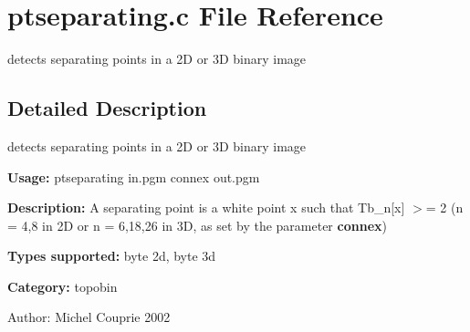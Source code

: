 \section{ptseparating.c File Reference}
\label{ptseparating_8c}
detects separating points in a 2D or 3D binary image 



\subsection{Detailed Description}
detects separating points in a 2D or 3D binary image 

{\bf Usage:} ptseparating in.pgm connex out.pgm

{\bf Description:} A separating point is a white point x such that Tb\_\-n[x] $>$= 2 (n = 4,8 in 2D or n = 6,18,26 in 3D, as set by the parameter {\bf connex})

{\bf Types supported:} byte 2d, byte 3d

{\bf Category:} topobin

\begin{Desc}
\item[Author:]Michel Couprie 2002 \end{Desc}
